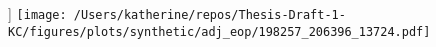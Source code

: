 \begin{figure}[h]]
\centering
\texttt{[image: /Users/katherine/repos/Thesis-Draft-1-KC/figures/plots/synthetic/adj\_eop/198257\_206396\_13724.pdf]}
\caption{}
\label{fig:}
\end{figure}
